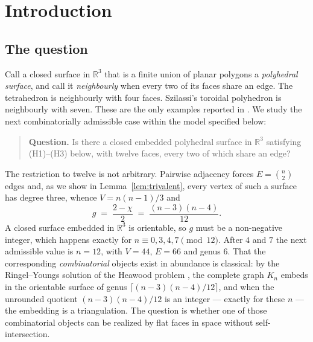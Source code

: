 \documentclass[11pt,reqno]{amsart}
\theoremstyle{plain}
\theoremstyle{definition}
\newcommand{\RR}{\mathbb{R}}
\begin{document}
\maketitle
\raggedbottom
\enlargethispage{3pt}

\section{Introduction}\label{sec:intro}

\subsection{The question}
Call a closed surface in $\RR^3$ that is a finite union of planar polygons a \emph{polyhedral
surface}, and call it \emph{neighbourly} when every two of its faces share an edge. The tetrahedron
is neighbourly with four faces. Szilassi's toroidal polyhedron \cite{Szilassi1986} is neighbourly
with seven. These are the only examples reported in \cite{ArsenevaEtAl2024}.
We study the next combinatorially admissible case within the model specified below:

\begin{quote}
\textbf{Question.} Is there a closed embedded polyhedral surface in $\RR^3$ satisfying
\textup{(H1)--(H3)} below, with twelve faces, every two of which share an edge?
\end{quote}

The restriction to twelve is not arbitrary. Pairwise adjacency forces $E=\binom{n}{2}$ edges and, as
we show in Lemma~\ref{lem:trivalent}, every vertex of such a surface has degree three, whence
$V=n(n-1)/3$ and
\[
   g \;=\; \frac{2-\chi}{2} \;=\; \frac{(n-3)(n-4)}{12}.
\]
A closed surface embedded in $\RR^3$ is orientable, so $g$ must be a non-negative integer, which
happens exactly for $n\equiv 0,3,4,7\pmod{12}$. After $4$ and $7$ the next admissible value is
$n=12$, with $V=44$, $E=66$ and genus $6$. That the corresponding \emph{combinatorial} objects exist
in abundance is classical: by the Ringel--Youngs solution of the Heawood problem
\cite{RingelYoungs1968,Ringel1974}, the complete graph $K_n$ embeds in the orientable surface of genus
$\lceil (n-3)(n-4)/12\rceil$, and when the unrounded quotient $(n-3)(n-4)/12$ is an integer --- exactly for
these $n$ --- the embedding is a triangulation. The
question is whether one of those combinatorial objects can be realized by flat faces in space
without self-intersection.
\end{document}
